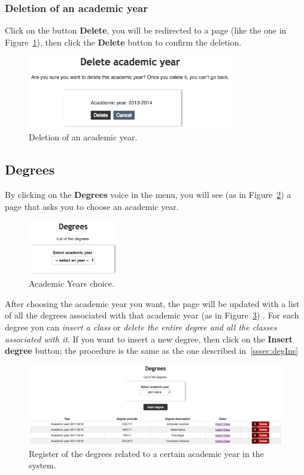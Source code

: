 \subsubsection{Deletion of an academic year}
Click on the button \textbf{Delete}, you will be redirected to a page (like the one in Figure~\ref{fig:deleteAcademicYear}), then click the \textbf{Delete} button to confirm the deletion.
\begin{figure}[!h]
  \centering
  \includegraphics[width=0.80\textwidth]{img/deleteAcademicYear.png}
  \caption{Deletion of an academic year.}
  \label{fig:deleteAcademicYear}
\end{figure}

\subsection{Degrees}
By clicking on the \textbf{Degrees} voice in the menu, you will see (as in Figure~\ref{fig:chooseYear}) a page that asks you to choose an academic year. 
\begin{figure}[!h]
	\centering
	\includegraphics[width=0.35\textwidth]{img/chooseYear.png}
	\caption{Academic Years choice.}
	\label{fig:chooseYear}
\end{figure}

After choosing the academic year you want, the page will be updated with a list of all the degrees associated with that academic year (as in Figure~\ref{fig:degreeCourses}) . For each degree you can \emph{insert a class}  or \emph{delete the entire degree and all the classes associated with it}. If you want to insert a new degree, then click on the \textbf{Insert degree} button; the procedure is the same as the one described in~\ref{sssec:degIns}
\begin{figure}[!h]
  \centering
  \includegraphics[width=1.0\textwidth]{img/degreeCourses.png}
  \caption{Register of the degrees related to a certain academic year in the system.}
  \label{fig:degreeCourses}
\end{figure}


